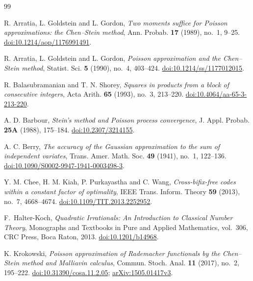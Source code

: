 \begin{thebibliography}{99}

R. Arratia, L. Goldstein and L. Gordon,
\emph{Two moments suffice for Poisson approximations: the Chen--Stein method},
Ann. Probab. \textbf{17} (1989), no.~1, 9--25.
\href{https://doi.org/10.1214/aop/1176991491}{doi:10.1214/aop/1176991491}.

R. Arratia, L. Goldstein and L. Gordon,
\emph{Poisson approximation and the Chen--Stein method},
Statist. Sci. \textbf{5} (1990), no.~4, 403--424.
\href{https://doi.org/10.1214/ss/1177012015}{doi:10.1214/ss/1177012015}.

R. Balasubramanian and T. N. Shorey,
\emph{Squares in products from a block of consecutive integers},
Acta Arith. \textbf{65} (1993), no.~3, 213--220.
\href{https://doi.org/10.4064/aa-65-3-213-220}{doi:10.4064/aa-65-3-213-220}.

A. D. Barbour,
\emph{Stein's method and Poisson process convergence},
J. Appl. Probab. \textbf{25A} (1988), 175--184.
\href{https://doi.org/10.2307/3214155}{doi:10.2307/3214155}.

A. C. Berry,
\emph{The accuracy of the Gaussian approximation to the sum of independent
variates},
Trans. Amer. Math. Soc. \textbf{49} (1941), no.~1, 122--136.
\href{https://doi.org/10.1090/S0002-9947-1941-0003498-3}
{doi:10.1090/S0002-9947-1941-0003498-3}.

Y. M. Chee, H. M. Kiah, P. Purkayastha and C. Wang,
\emph{Cross-bifix-free codes within a constant factor of optimality},
IEEE Trans. Inform. Theory \textbf{59} (2013), no.~7, 4668--4674.
\href{https://doi.org/10.1109/TIT.2013.2252952}{doi:10.1109/TIT.2013.2252952}.

F.~Halter-Koch,
\emph{Quadratic Irrationals: An Introduction to Classical Number Theory},
Monographs and Textbooks in Pure and Applied Mathematics, vol.~306,
CRC Press, Boca Raton, 2013.
\href{https://doi.org/10.1201/b14968}{doi:10.1201/b14968}.

K. Krokowski,
\emph{Poisson approximation of Rademacher functionals by the Chen--Stein
method and Malliavin calculus},
Commun. Stoch. Anal. \textbf{11} (2017), no.~2, 195--222.
\href{https://doi.org/10.31390/cosa.11.2.05}{doi:10.31390/cosa.11.2.05};
\href{https://arxiv.org/abs/1505.01417v3}{arXiv:1505.01417v3}.


\end{thebibliography}
